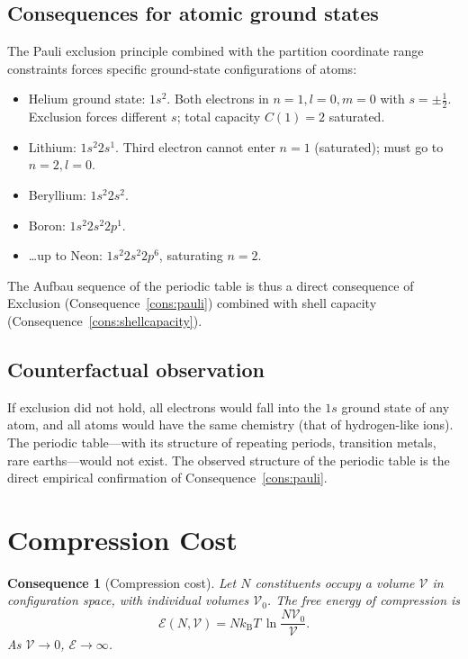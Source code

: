 \documentclass[11pt,twocolumn,a4paper]{article}
\theoremstyle{axiomstyle}
\theoremstyle{conseqstyle}
\newtheorem{consequence}{Consequence}
\theoremstyle{definition}
\theoremstyle{remark}
\newcommand{\kB}{k_{\mathrm{B}}}
\begin{document}
\subsection{Consequences for atomic ground states}

The Pauli exclusion principle combined with the partition coordinate range constraints forces specific ground-state configurations of atoms:
\begin{itemize}
\item Helium ground state: $1s^{2}$. Both electrons in $n=1,l=0,m=0$ with $s=\pm\tfrac{1}{2}$. Exclusion forces different $s$; total capacity $C(1)=2$ saturated.
\item Lithium: $1s^{2}2s^{1}$. Third electron cannot enter $n=1$ (saturated); must go to $n=2,l=0$.
\item Beryllium: $1s^{2}2s^{2}$.
\item Boron: $1s^{2}2s^{2}2p^{1}$.
\item \ldots up to Neon: $1s^{2}2s^{2}2p^{6}$, saturating $n=2$.
\end{itemize}

The Aufbau sequence of the periodic table is thus a direct consequence of Exclusion (Consequence~\ref{cons:pauli}) combined with shell capacity (Consequence~\ref{cons:shellcapacity}).

\subsection{Counterfactual observation}

If exclusion did not hold, all electrons would fall into the $1s$ ground state of any atom, and all atoms would have the same chemistry (that of hydrogen-like ions). The periodic table---with its structure of repeating periods, transition metals, rare earths---would not exist. The observed structure of the periodic table is the direct empirical confirmation of Consequence~\ref{cons:pauli}.

\section{Compression Cost}
\label{sec:compression}

\begin{consequence}[Compression cost]
\label{cons:compression}
Let $N$ constituents occupy a volume $\mathcal{V}$ in configuration space, with individual volumes $\mathcal{V}_{0}$. The free energy of compression is
\begin{equation}
\mathcal{E}(N,\mathcal{V})=N\kB T\,\ln\!\frac{N\mathcal{V}_{0}}{\mathcal{V}}.
\label{eq:compressioncost}
\end{equation}
As $\mathcal{V}\to 0$, $\mathcal{E}\to\infty$.
\end{consequence}
\end{document}
